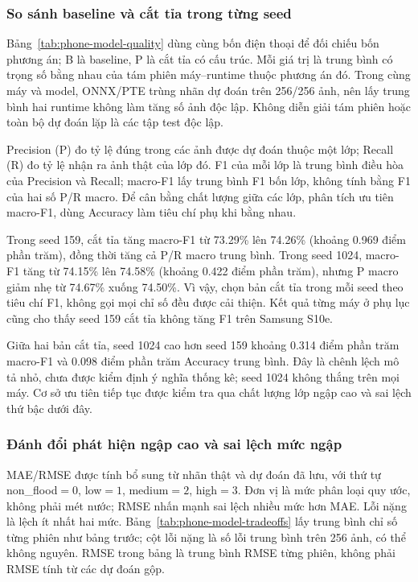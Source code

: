 \subsubsection{So sánh baseline và cắt tỉa trong từng seed}
Bảng~\ref{tab:phone-model-quality} dùng cùng bốn điện thoại để đối chiếu bốn phương án; B là baseline, P là cắt tỉa có cấu trúc. Mỗi giá trị là trung bình có trọng số bằng nhau của tám phiên máy--runtime thuộc phương án đó. Trong cùng máy và model, ONNX/PTE trùng nhãn dự đoán trên 256/256 ảnh, nên lấy trung bình hai runtime không làm tăng số ảnh độc lập. Không diễn giải tám phiên hoặc toàn bộ dự đoán lặp là các tập test độc lập.



Precision (P) đo tỷ lệ đúng trong các ảnh được dự đoán thuộc một lớp; Recall (R) đo tỷ lệ nhận ra ảnh thật của lớp đó. F1 của mỗi lớp là trung bình điều hòa của Precision và Recall; macro-F1 lấy trung bình F1 bốn lớp, không tính bằng F1 của hai số P/R macro. Để cân bằng chất lượng giữa các lớp, phân tích ưu tiên macro-F1, dùng Accuracy làm tiêu chí phụ khi bằng nhau.

Trong seed 159, cắt tỉa tăng macro-F1 từ 73.29\% lên 74.26\% (khoảng 0.969 điểm phần trăm), đồng thời tăng cả P/R macro trung bình. Trong seed 1024, macro-F1 tăng từ 74.15\% lên 74.58\% (khoảng 0.422 điểm phần trăm), nhưng P macro giảm nhẹ từ 74.67\% xuống 74.50\%. Vì vậy, chọn bản cắt tỉa trong mỗi seed theo tiêu chí F1, không gọi mọi chỉ số đều được cải thiện. Kết quả từng máy ở phụ lục cũng cho thấy seed 159 cắt tỉa không tăng F1 trên Samsung S10e.

Giữa hai bản cắt tỉa, seed 1024 cao hơn seed 159 khoảng 0.314 điểm phần trăm macro-F1 và 0.098 điểm phần trăm Accuracy trung bình. Đây là chênh lệch mô tả nhỏ, chưa được kiểm định ý nghĩa thống kê; seed 1024 không thắng trên mọi máy. Cơ sở ưu tiên tiếp tục được kiểm tra qua chất lượng lớp ngập cao và sai lệch thứ bậc dưới đây.

\subsubsection{Đánh đổi phát hiện ngập cao và sai lệch mức ngập}
MAE/RMSE được tính bổ sung từ nhãn thật và dự đoán đã lưu, với thứ tự non\_flood$=0$, low$=1$, medium$=2$, high$=3$. Đơn vị là mức phân loại quy ước, không phải mét nước; RMSE nhấn mạnh sai lệch nhiều mức hơn MAE. Lỗi nặng là lệch ít nhất hai mức. Bảng~\ref{tab:phone-model-tradeoffs} lấy trung bình chỉ số từng phiên như bảng trước; cột lỗi nặng là số lỗi trung bình trên 256 ảnh, có thể không nguyên. RMSE trong bảng là trung bình RMSE từng phiên, không phải RMSE tính từ các dự đoán gộp.

